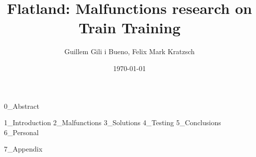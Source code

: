 \documentclass{llncs}
\begin{document}
\title{Flatland: Malfunctions research on Train Training}
\author{Guillem Gili i Bueno, Felix Mark Kratzsch}
\date{\today}
\maketitle

{0_Abstract}

\setcounter{tocdepth}{4}
\tableofcontents

{1_Introduction}
{2_Malfunctions}
{3_Solutions}
{4_Testing}
{5_Conclusions}
{6_Personal}


% 
{}

{7_Appendix}
\end{document}
